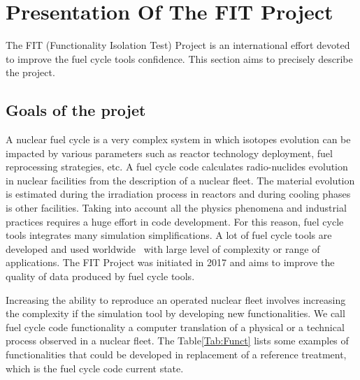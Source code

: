 \section{Presentation Of The FIT Project}

The FIT (Functionality Isolation Test) Project is an international effort devoted to improve the fuel cycle tools confidence. This section aims to precisely describe the project.


\subsection{Goals of the projet}

A nuclear fuel cycle is a very complex system in which isotopes evolution can be impacted by various parameters such as reactor technology deployment, fuel reprocessing strategies, etc. A fuel cycle code calculates radio-nuclides evolution in nuclear facilities from the description of a nuclear fleet. The material evolution is estimated during the irradiation process in reactors and during cooling phases is other facilities. Taking into account all the physics phenomena and industrial practices requires a huge effort in code development. For this reason, fuel cycle tools integrates many simulation simplifications. A lot of fuel cycle tools are developed and used worldwide~\cite{COSI6_2015, VanDenDurpel2015, Huff2016} with large level of complexity or range of applications. The FIT Project was initiated in 2017 and aims to improve the quality of data produced by fuel cycle tools. 

Increasing the ability to reproduce an operated nuclear fleet involves increasing the complexity if the simulation tool by developing new functionalities. We call fuel cycle code functionality a computer translation of a physical or a technical process observed in a nuclear fleet. The Table\ref{Tab:Funct} lists some examples of functionalities that could be developed in replacement of a reference treatment, which is the fuel cycle code current state.

